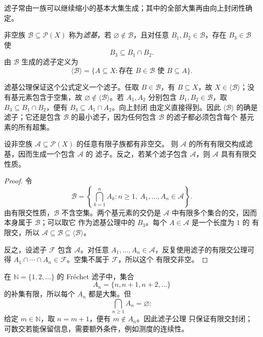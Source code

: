滤子常由一族可以继续缩小的基本大集生成；其中的全部大集再由向上封闭性确定。

\begin{definition}[滤基及其生成滤子]
非空族 \(\mathcal B\subseteq\mathcal P(X)\) 称为\emph{滤基}，若
\(\varnothing\notin\mathcal B\)，且对任意 \(B_1,B_2\in\mathcal B\)，存在
\(B_3\in\mathcal B\) 使
\[
 B_3\subseteq B_1\cap B_2.
\]
由 \(\mathcal B\) 生成的滤子定义为
\[
 \langle\mathcal B\rangle
 =\{A\subseteq X:\text{存在 }B\in\mathcal B\text{ 使 }B\subseteq A\}.
\]
\end{definition}

滤基公理保证这个公式定义一个滤子。任取 \(B\in\mathcal B\)，有 \(B\subseteq X\)，故
\(X\in\langle\mathcal B\rangle\)；没有基元素包含于空集，故
\(\varnothing\notin\langle\mathcal B\rangle\)。若 \(A_1,A_2\) 分别包含
\(B_1,B_2\in\mathcal B\)，取
\(B_3\subseteq B_1\cap B_2\)，便有 \(B_3\subseteq A_1\cap A_2\)。向上封闭
由定义直接得到。因此 \(\langle\mathcal B\rangle\) 的确是滤子；它还是包含
\(\mathcal B\) 的最小滤子，因为任何包含 \(\mathcal B\) 的滤子都必须包含每个
基元素的所有超集。

\begin{proposition}[有限交性质的延拓]
设非空族 \(\mathcal A\subseteq\mathcal P(X)\) 的任意有限子族都有非空交。
则 \(\mathcal A\) 的所有有限交构成滤基，因而生成一个包含 \(\mathcal A\) 的
滤子。反之，若某个滤子包含 \(\mathcal A\)，则 \(\mathcal A\) 具有有限交性质。
\label{ch1:prop:fip-filter}
\end{proposition}

\begin{proof}
令
\[
 \mathcal B=\left\{\bigcap_{k=1}^n A_k:
 n\geq1,\ A_1,\ldots,A_n\in\mathcal A\right\}.
\]
由有限交性质，\(\mathcal B\) 不含空集。两个基元素的交仍是
\(\mathcal A\) 中有限多个集合的交，因而本身属于 \(\mathcal B\)；可以取它
作为滤基公理中的 \(B_3\)。每个 \(A\in\mathcal A\) 是一个长度为 \(1\) 的
有限交，所以 \(\mathcal A\subseteq\mathcal B\subseteq
\langle\mathcal B\rangle\)。

反之，设滤子 \(\mathcal F\) 包含 \(\mathcal A\)。对任意
\(A_1,\ldots,A_n\in\mathcal A\)，反复使用滤子的有限交公理可得
\(A_1\cap\cdots\cap A_n\in\mathcal F\)。空集不属于 \(\mathcal F\)，所以这个
有限交非空。
\end{proof}

\begin{counterexample}[为何不能任意求交]
在 \(\mathbb N=\{1,2,\ldots\}\) 的 Fr\'echet 滤子中，集合
\[
 A_n=\{n,n+1,n+2,\ldots\}
\]
的补集有限，所以每个 \(A_n\) 都是大集。但
\[
 \bigcap_{n\geq1}A_n=\varnothing:
\]
给定 \(m\in\mathbb N\)，取 \(n=m+1\)，便有 \(m\notin A_n\)。因此滤子公理
只保证有限交封闭；可数交若能保留信息，需要额外条件，例如测度的连续性。
\end{counterexample}

